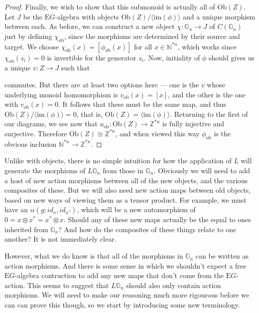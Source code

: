 \documentclass{amsart} %
\newenvironment{eq*}{\begin{equation*}}{\end{equation*}}
\begin{document}
\begin{proof}
Finally, we wish to show that this submonoid is actually all of  $\mathrm{Ob}(Z)$. Let $J$ be the $\mathrm{E}G$-algebra with objects $\mathrm{Ob}(Z) / \langle \mathrm{im}(\phi) \rangle$ and a unique morphism between each. As before, we can construct a new object $\chi : \mathbb{G}_n \to J$ of $C(\mathbb{G}_n)$ just by defining $\chi_{\mathrm{ob}}$, since the morphisms are determined by their source and target. We choose $\chi_{\mathrm{ob}}(x) = [\phi_{\mathrm{ob}}(x)]$ for all $x \in \mathbb{N}^{*n}$, which works since $\chi_{\mathrm{ob}}(z_i) = 0$ is invertible for the generator $z_i$. Now, initiality of $\phi$ should gives us a unique $v : Z \to J$ such that 
\begin{eq*} 
\end{eq*}
commutes. But there are at least two options here --- one is the $v$ whose underlying monoid homomorphism is $v_{\mathrm{ob}}(x) = [x]$, and the other is the one with $v_{\mathrm{ob}}(x) = 0$. It follows that these must be the same map, and thus $ \mathrm{Ob}(Z) / \langle \mathrm{im}(\phi) \rangle = 0$, that is, $\mathrm{Ob}(Z) =  \langle \mathrm{im}(\phi) \rangle$. Returning to the first of our diagrams, we see now that $u_{\mathrm{ob}} : \mathrm{Ob}(Z) \to \mathbb{Z}^{*n}$ is fully injective and surjective. Therefore $ \mathrm{Ob}(Z) \cong \mathbb{Z}^{*n}$, and when viewed this way $\phi_{\mathrm{ob}}$ is the obvious inclusion $\mathbb{N}^{*n} \to \mathbb{Z}^{*n}$.
\end{proof}

Unlike with objects, there is no simple intuition for how the application of $L$ will generate the morphisms of $L\mathbb{G}_n$ from those in $\mathbb{G}_n$. Obviously we will need to add a host of new action morphisms between all of the new objects, and the various composites of these. But we will also need new action maps between old objects, based on new ways of viewing them as a tensor product. For example, we must have an $\alpha(g; id_x, id_{x^*})$, which will be a new automorphism of $0 = x \otimes x^* = x^* \otimes x$. Should any of these new maps actually be the equal to ones inherited from $\mathbb{G}_n$? And how do the composites of these things relate to one another? It is not immediately clear. 

However, what we do know is that all of the morphisms in $\mathbb{G}_n$ can be written as action morphisms. And there is some sense in which we shouldn't expect a free $\mathrm{E}G$-algebra contruction to add any new maps that don't come from the $\mathrm{E}G$-action. This seems to suggest that $L\mathbb{G}_n$ should also only contain action morphisms. We will need to make our reasoning much more rigourous before we can can prove this though, so we start by introducing some new terminology.
\end{document}
